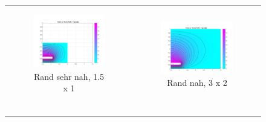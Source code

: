 \begin{figure}[ht]
	\centering
\begin{tabular}{cc}
\begin{subfigure}{0.45\textwidth}
	\centering
	\includegraphics[width=\linewidth]{../Netgen/pdetool/pde-near}
	\caption{Rand sehr nah, 1.5 x 1}
	\label{fig:pde-near}
\end{subfigure} &
\begin{subfigure}{0.45\textwidth}
	\centering
	\includegraphics[width=\linewidth]{../Netgen/pdetool/pde-far}
	\caption{Rand nah, 3 x 2}
	\label{fig:pde-far}
\end{subfigure} \\
\begin{subfigure}{0.45\textwidth}

\end{subfigure}
\end{tabular}
\end{figure}

